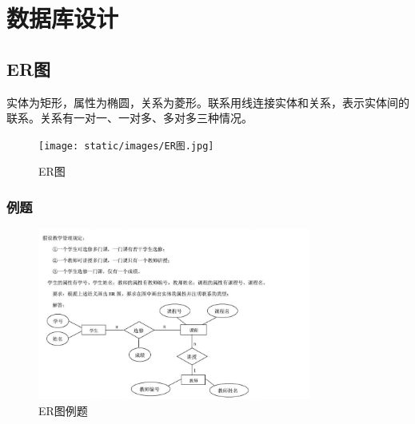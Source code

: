 \section{数据库设计}
\subsection{ER图}
实体为矩形，属性为椭圆，关系为菱形。联系用线连接实体和关系，表示实体间的联系。关系有一对一、一对多、多对多三种情况。
\begin{figure}[H]
\centering
\texttt{[image: static/images/ER图.jpg]}
\caption{ER图}
\end{figure}
\subsubsection{例题}
\begin{figure}[H]
\centering
\includegraphics[width=0.8\textwidth]{static/images/ER图例题.png}
\caption{ER图例题}
\end{figure}

